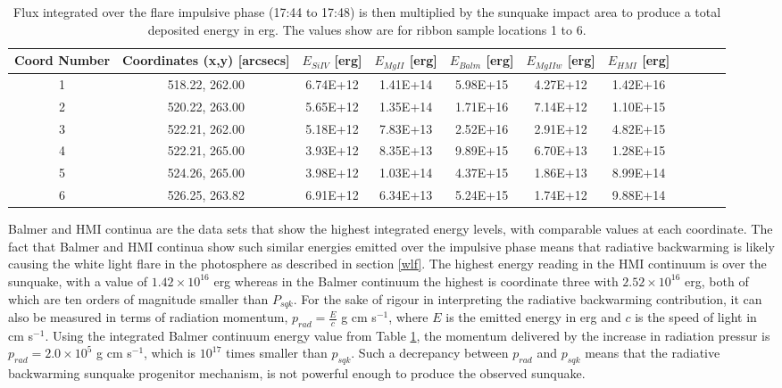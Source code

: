 \begin{table}[h]
\centering
\begin{tabular}{|c|c|c|c|c|c|c|c|c|c|c|}
Coord Number & Coordinates (x,y) [arcsecs] & $E_{Si IV}$ [erg] & $E_{Mg II}$ [erg] & $E_{Balm}$ [erg] & $E_{Mg II w}$ [erg] & $E_{HMI}$ [erg]\\
\hline
1 & 518.22, 262.00 & 6.74E+12 & 1.41E+14 & 5.98E+15 & 4.27E+12 & 1.42E+16\\
2 & 520.22, 263.00 & 5.65E+12 & 1.35E+14 & 1.71E+16 & 7.14E+12 & 1.10E+15\\
3 & 522.21, 262.00 & 5.18E+12 & 7.83E+13 & 2.52E+16 & 2.91E+12 & 4.82E+15\\
4 & 522.21, 265.00 & 3.93E+12 & 8.35E+13 & 9.89E+15 & 6.70E+13 & 1.28E+15\\
5 & 524.26, 265.00 & 3.98E+12 & 1.03E+14 & 4.37E+15 & 1.86E+13 & 8.99E+14\\
6 & 526.25, 263.82 & 6.91E+12 & 6.34E+13 & 5.24E+15 & 1.74E+12 & 9.88E+14\\
\end{tabular}
\caption{Flux integrated over the flare impulsive phase (17:44 to 17:48) is then multiplied by the sunquake impact area to produce a total deposited energy in erg. The values show are for ribbon sample locations 1 to 6.}\label{eimp}
\end{table}
\noindent
Balmer and HMI continua are the data sets that show the highest integrated energy levels, with comparable values at each coordinate. The fact that Balmer and HMI continua show such similar energies emitted over the impulsive phase means that radiative backwarming is likely causing the white light flare in the photosphere as described in section \ref{wlf}. The highest energy reading in the HMI continuum is over the sunquake, with a value of $1.42{\times}10^{16}$ erg whereas in the Balmer continuum the highest is coordinate three with $2.52{\times}10^{16}$ erg, both of which are ten orders of magnitude smaller than $P_{sqk}$. For the sake of rigour in interpreting the radiative backwarming contribution, it can also be measured in terms of radiation momentum, $p_{rad}=\frac{E}{c}$ g cm s$^{-1}$, where $E$ is the emitted energy in erg and $c$ is the speed of light in cm s$^{-1}$. Using the integrated Balmer continuum energy value from Table \ref{eimp}, the momentum delivered by the increase in radiation pressur is $p_{rad} = 2.0{\times}10^{5}$ g cm s$^{-1}$, which is $10^{17}$ times smaller than $p_{sqk}$. Such a decrepancy between $p_{rad}$ and $p_{sqk}$ means that the radiative backwarming sunquake progenitor mechanism, is not powerful enough to produce the observed sunquake. \\ 

